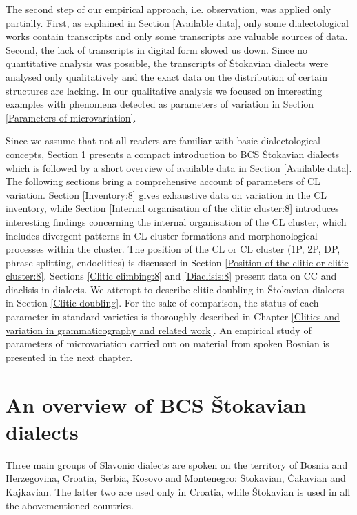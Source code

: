 The second step of our empirical approach, i.e. observation, was applied only partially. First, as explained in Section \ref{Available data}, only some dialectological works contain transcripts and only some transcripts are valuable sources of data. Second, the lack of transcripts in digital form slowed us down. Since no quantitative analysis was possible, the transcripts of Štokavian dialects were analysed only qualitatively and the exact data on the distribution of certain structures are lacking. In our qualitative analysis we focused on interesting examples with phenomena detected as parameters of variation in Section \ref{Parameters of microvariation}.    

Since we assume that not all readers are familiar with basic dialectological concepts, Section \ref{An overview of BCS Štokavian dialects} presents a compact introduction to BCS Štokavian dialects which is followed by a short overview of available data in Section \ref{Available data}. The following sections bring a comprehensive account of parameters of CL variation. Section \ref{Inventory:8} gives exhaustive data on variation in the CL inventory, while Section \ref{Internal organisation of the clitic cluster:8} introduces interesting findings concerning the internal organisation of the CL cluster, which includes divergent patterns in CL cluster formations and morphonological processes within the cluster. The position of the CL or CL cluster (1P, 2P, DP, phrase splitting, endoclitics) is discussed in Section \ref{Position of the clitic or clitic cluster:8}. Sections \ref{Clitic climbing:8} and \ref{Diaclisis:8} present data on CC and diaclisis in dialects. We attempt to describe clitic doubling in Štokavian dialects in Section \ref{Clitic doubling}. For the sake of comparison, the status of each parameter in standard varieties is thoroughly described in Chapter \ref{Clitics and variation in grammaticography and related work}. An empirical study of parameters of microvariation carried out on material from spoken Bosnian is presented in the next chapter.  

\section{An overview of BCS Štokavian dialects}
\label{An overview of BCS Štokavian dialects}
Three main groups of Slavonic dialects are spoken on the territory of Bosnia and Herzegovina, Croatia, Serbia, Kosovo and Montenegro: Štokavian, Čakavian and Kajkavian. The latter two are used only in Croatia, while Štokavian is used in all the abovementioned countries.   

